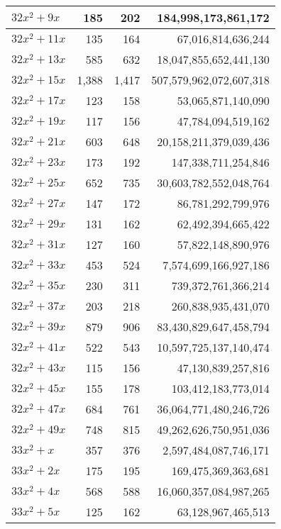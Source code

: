 \documentclass[a4paper]{amsproc}
\theoremstyle{plain}
\theoremstyle{named}
\begin{document}
\begin{longtable}{ | l | r | r | r | }
$32x^2 + 9x$ & 185 & 202 & 184{,}998{,}173{,}861{,}172 \\ \hline
$32x^2 + 11x$ & 135 & 164 & 67{,}016{,}814{,}636{,}244 \\ \hline
$32x^2 + 13x$ & 585 & 632 & 18{,}047{,}855{,}652{,}441{,}130 \\ \hline
$32x^2 + 15x$ & 1{,}388 & 1{,}417 & 507{,}579{,}962{,}072{,}607{,}318 \\ \hline
$32x^2 + 17x$ & 123 & 158 & 53{,}065{,}871{,}140{,}090 \\ \hline
$32x^2 + 19x$ & 117 & 156 & 47{,}784{,}094{,}519{,}162 \\ \hline
$32x^2 + 21x$ & 603 & 648 & 20{,}158{,}211{,}379{,}039{,}436 \\ \hline
$32x^2 + 23x$ & 173 & 192 & 147{,}338{,}711{,}254{,}846 \\ \hline
$32x^2 + 25x$ & 652 & 735 & 30{,}603{,}782{,}552{,}048{,}764 \\ \hline
$32x^2 + 27x$ & 147 & 172 & 86{,}781{,}292{,}799{,}976 \\ \hline
$32x^2 + 29x$ & 131 & 162 & 62{,}492{,}394{,}665{,}422 \\ \hline
$32x^2 + 31x$ & 127 & 160 & 57{,}822{,}148{,}890{,}976 \\ \hline
$32x^2 + 33x$ & 453 & 524 & 7{,}574{,}699{,}166{,}927{,}186 \\ \hline
$32x^2 + 35x$ & 230 & 311 & 739{,}372{,}761{,}366{,}214 \\ \hline
$32x^2 + 37x$ & 203 & 218 & 260{,}838{,}935{,}431{,}070 \\ \hline
$32x^2 + 39x$ & 879 & 906 & 83{,}430{,}829{,}647{,}458{,}794 \\ \hline
$32x^2 + 41x$ & 522 & 543 & 10{,}597{,}725{,}137{,}140{,}474 \\ \hline
$32x^2 + 43x$ & 115 & 156 & 47{,}130{,}839{,}257{,}816 \\ \hline
$32x^2 + 45x$ & 155 & 178 & 103{,}412{,}183{,}773{,}014 \\ \hline
$32x^2 + 47x$ & 684 & 761 & 36{,}064{,}771{,}480{,}246{,}726 \\ \hline
$32x^2 + 49x$ & 748 & 815 & 49{,}262{,}626{,}750{,}951{,}036 \\ \hline
$33x^2 + x$ & 357 & 376 & 2{,}597{,}484{,}087{,}746{,}171 \\ \hline
$33x^2 + 2x$ & 175 & 195 & 169{,}475{,}369{,}363{,}681 \\ \hline
$33x^2 + 4x$ & 568 & 588 & 16{,}060{,}357{,}084{,}987{,}265 \\ \hline
$33x^2 + 5x$ & 125 & 162 & 63{,}128{,}967{,}465{,}513 \\ \hline

\end{longtable}
\end{document}
